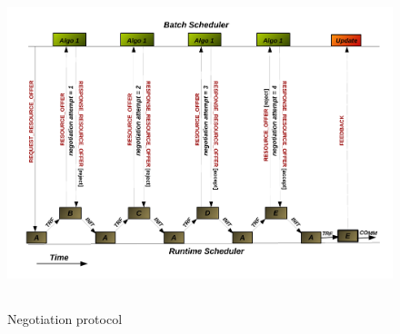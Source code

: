 \begin{figure}[!b]
\vspace{-0.50in}
\hspace*{-0.5in}
\includegraphics[width=1.2\textwidth, height=95mm]{./figures/negotiation.pdf}
\caption{Negotiation protocol}
\label{fig:2}
\end{figure}
